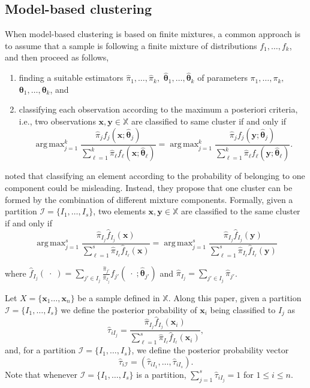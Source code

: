 \documentclass[10pt, a4paper]{article}
\DeclareMathOperator*{\argmax}{arg\,max}
\newcommand{\m}[1]{\boldsymbol{#1}}
\begin{document}
\subsection*{Model-based clustering}

When model-based clustering is based on finite mixtures, a common approach is to assume that a sample is following a finite mixture of distributions $f_1, \dots, f_k$, and then proceed as follows, 
\begin{enumerate}
\item finding a suitable estimators $\hat{\pi}_1, \dots, \hat{\pi}_k,$ $\hat{\m\theta}_1, \dots, \hat{\m\theta}_k$ of parameters $\pi_1, \dots, \pi_k,$ $\m\theta_1, \dots, \m\theta_k$, and
\item classifying each observation according to the maximum a posteriori criteria, i.e., two observations $\m x, \m y \in \mathbb{X}$ are classified to same cluster if and only if
\[
\argmax_{j=1}^k \frac{ \hat{\pi}_j f_j(\m x ; \hat{\m\theta}_j) }{\sum_{\ell=1}^k \hat{\pi}_\ell f_\ell(\m x ; \hat{\m\theta}_\ell) } = \argmax_{j=1}^k \frac{ \hat{\pi}_j f_j(\m y ; \hat{\m\theta}_j) }{ \sum_{\ell=1}^k \hat{\pi}_\ell f_\ell(\m y ; \hat{\m\theta}_\ell) }.
\]
\end{enumerate}


\cite{lee2004combining,hennig2010methods,baudry2010combining,melnykov2013distribution,pastore2013merging} noted that classifying an element according to the probability of belonging to one component could be misleading. Instead, they propose that one cluster can be formed by the combination of different mixture components. Formally, given a partition $\mathcal{I} = \{ I_1, \dots, I_s\}$, two elements $\m x, \m y \in \mathbb{X}$ are classified to the same cluster if and only if
\begin{equation}\label{cluster_criteria}
\argmax_{j=1}^s \frac{ \hat{\pi}_{I_j} \hat{f}_{I_j}(\m x) }{\sum_{\ell=1}^s \hat{\pi}_{I_\ell} \hat{f}_{I_\ell}(\m x ) } = \argmax_{j=1}^s \frac{ \hat{\pi}_{I_j} \hat{f}_{I_j}(\m y) }{ \sum_{\ell=1}^s \hat{\pi}_{I_\ell} \hat{f}_{I_\ell}(\m y) }
\end{equation}

where $\hat{f}_{I_j}(\; \cdot \;) = \sum_{j' \in I_j} \frac{\hat{\pi}_{j'}}{\hat{\pi}_{I_j}} f_{j'}(\; \cdot \; ; \hat{\m\theta}_{j'})$ and $\hat{\pi}_{I_j} =  \sum_{j' \in I_j} \hat{\pi}_{j'}$. 

Let $X = \{\m x_1\dots, \m x_n\}$ be a sample defined in $\mathbb{X}$. Along this paper, given a partition $\mathcal{I} = \{ I_1, \dots, I_s \}$ we define the posterior probability  of $\m x_i$ being classified to $I_j$ as
\[
\hat{\tau}_{i I_j} =  \frac{ \hat{\pi}_{I_j} \hat{f}_{I_j}(\m x_i) }{\sum_{\ell=1}^s \hat{\pi}_{I_\ell} \hat{f}_{I_\ell}(\m x_i)},
\]
and, for a partition  $\mathcal{I} = \{ I_1, \dots, I_s\}$, we define the posterior probability vector
\[
\hat{\tau}_{i \mathcal{I}} = \left( \hat{\tau}_{i I_1} , \dots, \hat{\tau}_{i I_s}  \right).
\]
Note that whenever  $\mathcal{I} = \{ I_1, \dots, I_s\}$ is a partition, $\sum_{j=1}^s \hat{\tau}_{i I_j} = 1$ for $1 \leq i \leq n$.
\end{document}
